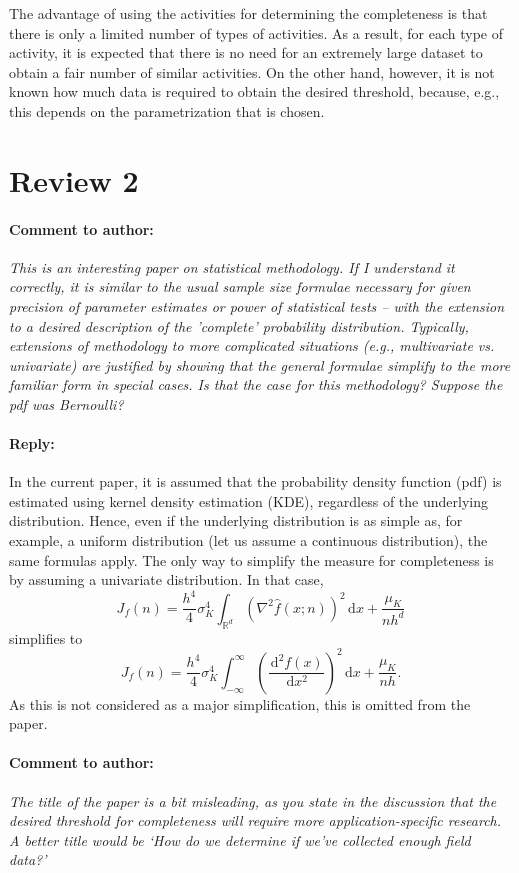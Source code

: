 \documentclass[10pt,final,a4paper,oneside,onecolumn]{article}
\newcommand{\measure}[2]{J_{#1} \left( #2 \right)}
\newcommand*{\ud}{\mathrm{\,d}}
\newcommand{\toauthor}{\paragraph*{Comment to author:} \itshape}
\newcommand{\fromauthor}{\paragraph*{Reply:} \normalfont}
\newcommand{\cstart}{\color{red}}
\newcommand{\cend}{\color{black}}
\begin{document}
\cstart 
The advantage of using the activities for determining the completeness is that there is only a limited number of types of activities. As a result, for each type of activity, it is expected that there is no need for an extremely large dataset to obtain a fair number of similar activities. On the other hand, however, it is not known how much data is required to obtain the desired threshold, because, e.g., this depends on the parametrization that is chosen. 
\cend 

\section*{Review 2}

\toauthor This is an interesting paper on statistical methodology. If I understand it correctly, it is similar to the usual sample size formulae necessary for given precision of parameter estimates or power of statistical tests -- with the extension to a desired description of the 'complete' probability distribution. Typically, extensions of methodology to more complicated situations (e.g., multivariate vs. univariate) are justified by showing that the general formulae simplify to the more familiar form in special cases. Is that the case for this methodology? Suppose the pdf was Bernoulli? 

\fromauthor In the current paper, it is assumed that the probability density function (pdf) is estimated using kernel density estimation (KDE), regardless of the underlying distribution. Hence, even if the underlying distribution is as simple as, for example, a uniform distribution (let us assume a continuous distribution), the same formulas apply. The only way to simplify the measure for completeness is by assuming a univariate distribution. In that case, 
\begin{equation}
	\measure{f}{n} = \frac{h^4}{4} \sigma_K^4 \int_{\mathbb{R}^d} \left( \nabla^2 \hat{f}(x;n) \right)^2 \ud x + \frac{\mu_K}{nh^d}
\end{equation}
simplifies to
\begin{equation}
	\measure{f}{n} = \frac{h^4}{4} \sigma_K^4 \int_{-\infty}^{\infty} \left( \frac{\ud^2 f(x)}{\ud x^2} \right)^2 \ud x + \frac{\mu_K}{nh}.
\end{equation}
As this is not considered as a major simplification, this is omitted from the paper.

\toauthor The title of the paper is a bit misleading, as you state in the discussion that the desired threshold for completeness will require more application-specific research. A better title would be `How do we determine if we've collected enough field data?'
\end{document}
